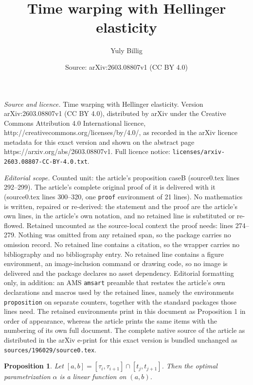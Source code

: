 \documentclass[10pt,a4paper]{amsart}
\title{Time warping with Hellinger elasticity}
\author{Yuly Billig}
\date{Source: arXiv:2603.08807v1 (CC BY 4.0)}
\newtheorem{proposition}{Proposition}
\begin{document}
\maketitle

\noindent\emph{Source and licence.} Time warping with Hellinger elasticity. Version arXiv:2603.08807v1 (CC BY 4.0), distributed by arXiv under the Creative Commons Attribution 4.0 International licence, http://creativecommons.org/licenses/by/4.0/, as recorded in the arXiv licence metadata for this exact version and shown on the abstract page https://arxiv.org/abs/2603.08807v1. Full licence notice: \texttt{licenses/arxiv-2603.08807-CC-BY-4.0.txt}.\par\smallskip

\noindent\textit{Editorial scope.} Counted unit: the article's proposition caseB (source0.tex lines 292--299). The article's complete original proof of it is delivered with it (source0.tex lines 300--320, one \texttt{proof} environment of 21 lines). No mathematics is written, repaired or re-derived: the statement and the proof are the article's own lines, in the article's own notation, and no retained line is substituted or re-flowed.  Retained uncounted as the source-local context the proof needs: lines 274--279.  Nothing was omitted from any retained span, so the package carries no omission record.  No retained line contains a citation, so the wrapper carries no bibliography and no bibliography entry.  No retained line contains a figure environment, an image-inclusion command or drawing code, so no image is delivered and the package declares no asset dependency.  Editorial formatting only, in addition: an AMS \texttt{amsart} preamble that restates the article's own declarations and macros used by the retained lines, namely the environments \texttt{proposition} on separate counters, together with the standard packages those lines need.  The retained environments print in this document as Proposition 1 in order of appearance, whereas the article prints the same items with the numbering of its own full document.  The complete native source of the article as distributed in the arXiv e-print for this exact version is bundled unchanged as \texttt{sources/196029/source0.tex}.
\begin{proposition}
\label{linear}
Let $[a,b] = [\tau_i, \tau_{i+1}] \cap [t_j, t_{j+1}]$. 
Then the optimal parametrization $\alpha$ is a linear function on $(a,b)$.
\end{proposition}
\end{document}
